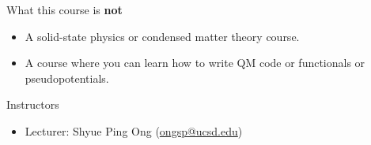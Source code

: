 \documentclass[aspectratio=169]{beamer}
\begin{document}
\begin{frame}{What this course is \textbf{not}}
\begin{itemize}
    \item A solid-state physics or condensed matter theory course.
    \item A course where you can learn how to write QM code or functionals or pseudopotentials.
\end{itemize}    
\end{frame}


\begin{frame}{Instructors}
    \begin{itemize}
        \item Lecturer: Shyue Ping Ong (\href{mailto:ongsp@ucsd.edu}{ongsp@ucsd.edu})
    \end{itemize}
\end{frame}
\end{document}
